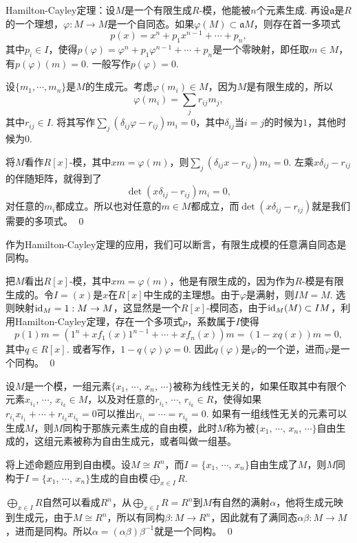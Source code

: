 \theo Hamilton-Cayley定理：设$M$是一个有限生成$R$-模，他能被$n$个元素生成. 再设$\mathfrak{a}$是$R$的一个理想，$\varphi:M\to M$是一个自同态。如果$\varphi(M)\subset \mathfrak{a}M$，则存在首一多项式
\[
	p(x)=x^n+p_1x^{n-1}+\cdots+p_n,
\]
其中$p_i\in I$，使得$p(\varphi)=\varphi^n+p_1\varphi^{n-1}+\cdots+p_n$是一个零映射，即任取$m\in M$，有$p(\varphi)(m)=0$. 一般写作$p(\varphi)=0$.

\proof
	设$\{m_1,\cdots,m_n\}$是$M$的生成元。考虑$\varphi(m_i)\in M$，因为$M$是有限生成的，所以
	\[
	\varphi(m_i)=\sum_{j}r_{ij}m_j,
	\]
	其中$r_{ij}\in I$. 将其写作$\sum_{j}(\delta_{ij}\varphi-r_{ij})m_i=0$，其中$\delta_{ij}$当$i=j$的时候为$1$，其他时候为$0$.

	将$M$看作$R[x]$-模，其中$xm=\varphi(m)$，则$\sum_{j}(\delta_{ij}x-r_{ij})m_i=0$. 左乘$x\delta_{ij}-r_{
	ij}$的伴随矩阵，就得到了
	\[
	\det\left(x\delta_{ij}-r_{ij}\right)m_i=0,
	\]
	对任意的$m_i$都成立。所以也对任意的$m\in M$都成立，而$\det\left(x\delta_{ij}-r_{ij}\right)$就是我们需要的多项式。
\qed

\para 作为Hamilton-Cayley定理的应用，我们可以断言，有限生成模的任意满自同态是同构。

\proof
	把$M$看出$R[x]$-模，其中$xm=\varphi(m)$，他是有限生成的，因为作为$R$-模是有限生成的。令$I=(x)$是$x$在$R[x]$中生成的主理想。由于$\varphi$是满射，则$IM=M$. 选则映射$\operatorname{id}_M=1:M\to M$，这显然是一个$R[x]$-模同态，由于$\operatorname{id}_M(M)\subset IM$，利用Hamilton-Cayley定理，存在一个多项式$p$，系数属于$I$使得
	\[
	p(1)m=\left(1^n+xf_1(x)1^{n-1}+\cdots+xf_n(x)\right)m=(1-xq(x))m=0,
	\]
	其中$q\in R[x]$. 或者写作，$1-q(\varphi)\varphi=0$. 因此$q(\varphi)$是$\varphi$的一个逆，进而$\varphi$是一个同构。
\qed

\para 设$M$是一个模，一组元素$\{x_1$, $\cdots$, $x_n$, $\cdots\}$被称为线性无关的，如果任取其中有限个元素$x_{i_1}$, $\cdots$, $x_{i_k}\in M$，以及对任意的$r_{i_1}$, $\cdots$, $r_{i_k}\in R$，使得如果$r_{i_1}x_{i_1}+\cdots+r_{i_k}x_{i_k}=0$可以推出$r_{i_1}=\cdots=r_{i_k}=0$. 如果有一组线性无关的元素可以生成$M$，则$M$同构于那族元素生成的自由模，此时$M$称为被$\{x_1$, $\cdots$, $x_n$, $\cdots\}$自由生成的，这组元素被称为自由生成元，或者叫做一组基。

\para 将上述命题应用到自由模。设$M\cong R^n$，而$I=\{x_1$, $\cdots$, $x_n\}$自由生成了$M$，则$M$同构于$I=\{x_1$, $\cdots$, $x_n\}$生成的自由模$\bigoplus_{x\in I} R$.

\proof
	$\bigoplus_{x\in I} R$自然可以看成$R^n$，从$\bigoplus_{x\in I} R=R^n$到$M$有自然的满射$\alpha$，他将生成元映到生成元，由于$M\cong R^n$，所以有同构$\beta:M\to R^n$，因此就有了满同态$\alpha\beta:M\to M$，进而是同构。所以$\alpha =(\alpha\beta)\beta^{-1}$就是一个同构。
\qed

